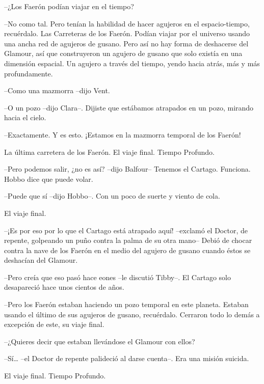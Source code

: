 {--¿Los Faerón podían viajar en el tiempo?}

{--No como tal. Pero tenían la habilidad de hacer agujeros en el
 espacio-tiempo, recuérdalo. Las Carreteras de los Faerón. Podían viajar
 por el universo usando una ancha red de agujeros de gusano. Pero así no
 hay forma de deshacerse del Glamour, así que construyeron un agujero de
 gusano que solo existía en una dimensión espacial. Un agujero a través
del tiempo, yendo hacia atrás, más y más profundamente.}

{--Como una mazmorra --dijo Vent.}

{--O un pozo --dijo Clara--. Dijiste que estábamos atrapados en un pozo,
mirando hacia el cielo.}

{--Exactamente. Y es esto. ¡Estamos en la mazmorra temporal de los
Faerón!}

{La última carretera de los Faerón. El viaje final. Tiempo Profundo.}

{--Pero podemos salir, ¿no es así? --dijo Balfour-- Tenemos el Cartago.
Funciona. Hobbo dice que puede volar.}

{--Puede que sí --dijo Hobbo--. Con un poco de suerte y viento de cola.}

{El viaje final.}

{--¡Es por eso por lo que el Cartago está atrapado aquí! --exclamó el
 Doctor, de repente, golpeando un puño contra la palma de su otra mano--
 Debió de chocar contra la nave de los Faerón en el medio del agujero de
gusano cuando éstos se deshacían del Glamour.}

{--Pero creía que eso pasó hace eones --le discutió Tibby--. El Cartago
solo desapareció hace unos cientos de años.}

{--Pero los Faerón estaban haciendo un pozo temporal en este planeta.
 Estaban usando el último de sus agujeros de gusano, recuérdalo. Cerraron
todo lo demás a excepción de este, su viaje final.}

{--¿Quieres decir que estaban llevándose el Glamour con ellos?}

{--Sí\ldots{} --el Doctor de repente palideció al darse cuenta--. Era una
misión suicida.}

{El viaje final. Tiempo Profundo.}
